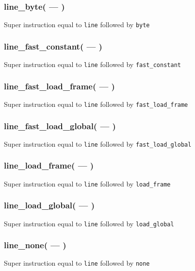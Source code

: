 \subsubsection{line\_byte( --- )}
\vspace{-1em}Super instruction equal to \texttt{line} followed by \texttt{byte} \vspace{-1em}
\subsubsection{line\_fast\_constant( --- )}
\vspace{-1em}Super instruction equal to \texttt{line} followed by \texttt{fast\_constant} \vspace{-1em}
\subsubsection{line\_fast\_load\_frame( --- )}
\vspace{-1em}Super instruction equal to \texttt{line} followed by \texttt{fast\_load\_frame} \vspace{-1em}
\subsubsection{line\_fast\_load\_global( --- )}
\vspace{-1em}Super instruction equal to \texttt{line} followed by \texttt{fast\_load\_global} \vspace{-1em}
\subsubsection{line\_load\_frame( --- )}
\vspace{-1em}Super instruction equal to \texttt{line} followed by \texttt{load\_frame} \vspace{-1em}
\subsubsection{line\_load\_global( --- )}
\vspace{-1em}Super instruction equal to \texttt{line} followed by \texttt{load\_global} \vspace{-1em}
\subsubsection{line\_none( --- )}
\vspace{-1em}Super instruction equal to \texttt{line} followed by \texttt{none} 

